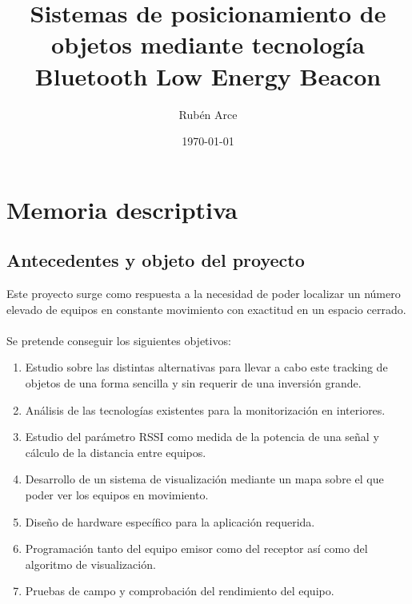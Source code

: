 \documentclass[a4paper ,12pt, onecolumn]{article}
\begin{document}
\pagestyle{fancy}
\title{Sistemas de posicionamiento de objetos mediante tecnología Bluetooth Low Energy Beacon }
\author{Rubén Arce}
\date{\today}
\maketitle
\cleardoublepage
\tableofcontents
\listoffigures
\listoftables
\cleardoublepage
\section{Memoria descriptiva}
    \subsection{Antecedentes y objeto del proyecto}
        Este proyecto surge como respuesta a la necesidad de poder localizar un número elevado de equipos en 
        constante movimiento con exactitud en un espacio cerrado.
        \paragraph{}
        Se pretende conseguir los siguientes objetivos:
        \begin{enumerate}
            \item Estudio sobre las distintas alternativas para llevar a cabo este tracking de objetos de una forma
            sencilla y sin requerir de una inversión grande.
            \item Análisis de las tecnologías existentes para la monitorización en interiores.
            \item Estudio del parámetro RSSI como medida de la potencia de una señal y cálculo de la distancia entre equipos.
            \item Desarrollo de un sistema de visualización mediante un mapa sobre el que poder ver los equipos en movimiento.
            \item Diseño de hardware específico para la aplicación requerida.
            \item Programación tanto del equipo emisor como del receptor así como del algoritmo de visualización.
            \item Pruebas de campo y comprobación del rendimiento del equipo.
        \end{enumerate}
\end{document}
